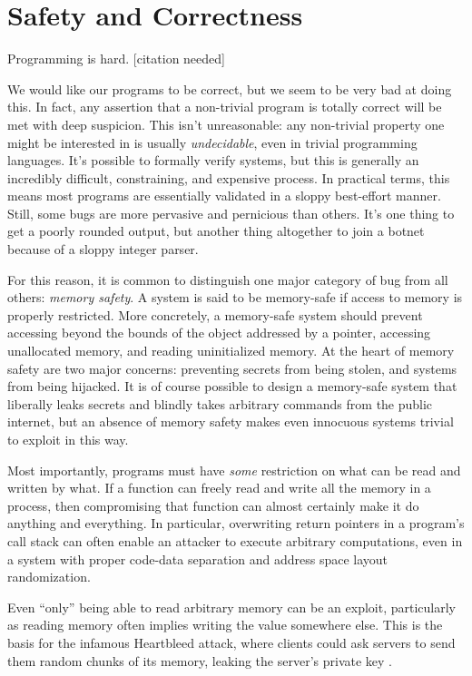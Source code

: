 \chapter{Safety and Correctness}
\label{ch:problems}

Programming is hard. [citation needed]

We would like our programs to be correct, but we seem to be very bad at doing
this. In fact, any assertion that a non-trivial program is totally correct
will be met with deep suspicion. This isn't unreasonable: any non-trivial property
one might be interested in is usually \emph{undecidable}, even in trivial programming
languages. \cite{rice1953classes}
It's possible to formally verify systems, but this is generally an
incredibly difficult, constraining, and expensive process. In practical terms,
this means most programs are essentially validated in a sloppy best-effort manner.
\cite{andronick2012large}
Still, some bugs are more pervasive and pernicious than others. It's one thing
to get a poorly rounded output, but another thing altogether to join a botnet
because of a sloppy integer parser.

For this reason, it is common to distinguish one major category of bug from
all others: \emph{memory safety}. A system is said to be memory-safe if access to memory is
properly restricted. More concretely, a memory-safe system should prevent accessing
beyond the bounds of the object addressed by a pointer, accessing unallocated
memory, and reading uninitialized memory. \cite{nagarakatte2014watchdoglite}
At the heart of memory safety are two major concerns:
preventing secrets from being stolen, and systems from being hijacked. It is
of course possible to design a memory-safe system that liberally leaks secrets
and blindly takes arbitrary commands from the public internet, but an absence
of memory safety makes even innocuous systems trivial to exploit in this way.

Most importantly, programs must have \emph{some} restriction on what can be read
and written by what. If a function can freely read and write all the memory
in a process, then compromising that function can almost certainly make it do
anything and everything. In particular, overwriting return pointers in a
program's call stack can often enable an attacker to execute arbitrary
computations, even in a system with proper code-data separation and address
space layout randomization. \cite{buchanan2008good}

Even ``only'' being able to read arbitrary memory can be an exploit, particularly
as reading memory often implies writing the value somewhere else. This is the
basis for the infamous Heartbleed attack, where clients could ask servers
to send them random chunks of its memory, leaking the server's private key
. \cite{schneier2014heartbleed}

